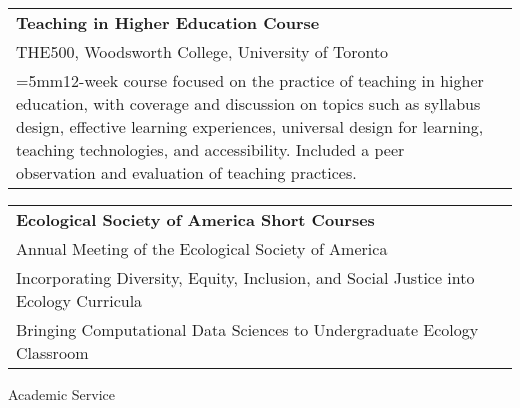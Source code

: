 \documentclass[letterpaper,11pt,oneside]{article}
\begin{document}
\def\arraystretch{1.1}
\noindent \begin{longtable}{@{} >{\raggedright\arraybackslash}p{15.5cm} >{\raggedright\arraybackslash}p{1.7cm}}


 \textbf{Teaching in Higher Education Course}  & 2022\\
THE500, Woodsworth College, University of Toronto \\
\hangindent=5mm12-week course focused on the practice of teaching in higher education, with coverage and discussion on topics such as syllabus design, effective learning experiences, universal design for learning, teaching technologies, and accessibility. Included a peer observation and evaluation of teaching practices. & \\
\end{longtable}


\def\arraystretch{1.1}
\noindent \begin{longtable}{@{} >{\raggedright\arraybackslash}p{15.5cm} >{\raggedright\arraybackslash}p{1.7cm}}

 \textbf{Ecological Society of America Short Courses}  & 2021\\
Annual Meeting of the Ecological Society of America & \\
  \hspace{5mm} Incorporating Diversity, Equity, Inclusion, and Social Justice into Ecology Curricula & \\
  \hspace{5mm} Bringing Computational Data Sciences to Undergraduate Ecology Classroom & \\
\end{longtable}

\bigskip





\noindent\Large{Academic Service}  
\normalsize
\bigskip
\end{document}
